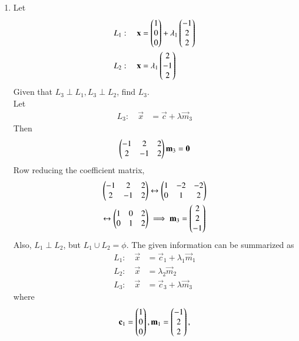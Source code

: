 \renewcommand{\theequation}{\theenumi}
\begin{enumerate}[label=\arabic*.,ref=\thesubsection.\theenumi]

\item Let
\begin{align}
L_1: \quad \mathbf{x} &= \begin{pmatrix}1 \\ 0 \\ 0\end{pmatrix} + \lambda_1 \begin{pmatrix}-1 \\ 2 \\ 2\end{pmatrix}
\\
L_2: \quad \mathbf{x} &=  \lambda_1 \begin{pmatrix}2 \\-1 \\ 2\end{pmatrix}
\end{align}
%
Given that  $L_3 \perp L_1, L_3 \perp L_2$, find $L_3$.
\\
\solution Let 
\begin{align}
L_3: \quad \vec{x} &= \vec{c}+ \lambda \vec{m}_3
\end{align}
% 
Then
\begin{align}
\begin{pmatrix}-1 & 2 & 2
\\
2 &-1 & 2\end{pmatrix}\mathbf{m}_3 = \mathbf{0}
\end{align}
%
Row reducing the coefficient matrix,
\begin{align}
\begin{pmatrix}-1 & 2 & 2
\\
2 &-1 & 2\end{pmatrix} &\leftrightarrow 
\begin{pmatrix}1 & -2 & -2
\\
0 &1 & 2\end{pmatrix} 
\\
\leftrightarrow 
\begin{pmatrix}1 & 0 & 2
\\
0 &1 & 2\end{pmatrix} 
& \implies \mathbf{m}_3 = \begin{pmatrix}2 \\ 2 \\ -1\end{pmatrix}
\end{align}
%
Also, $L_1\perp L_2$, but $L_1 \cup L_2 = \phi$. The given information can be summarized as
\begin{align}
\label{eq:12-given1}
L_1: \quad \vec{x} &= \vec{c}_1 + \lambda_1 \vec{m}_1
\\
L_2: \quad \vec{x} &=  \lambda_2 \vec{m}_2
\\
L_3: \quad \vec{x} &= \vec{c}_3 + \lambda \vec{m}_3
\label{eq:12-given3}
\end{align}
%
where
\begin{align}
\label{eq:12-given12}
\vec{c}_1 = \myvec{1 \\ 0 \\ 0}, \vec{m}_1=  \myvec{-1 \\ 2 \\ 2},

\end{align}
\end{enumerate}
